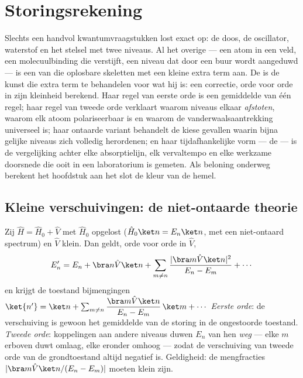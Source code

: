 \chapter{Storingsrekening}\label{ch:b3:perturbation-theory}

Slechts een handvol kwantumvraagstukken lost exact op: de doos, de
oscillator, waterstof en het stelsel met twee niveaus. Al het overige ---
een atom in een veld, een molecuulbinding die verstijft, een niveau dat
door een buur wordt aangeduwd --- is een van die oplosbare skeletten met
een kleine extra term aan. De  is de kunst die extra term
te behandelen voor wat hij is: een correctie, orde voor orde in zijn
kleinheid berekend. Haar regel van eerste orde is een gemiddelde van één
regel; haar regel van tweede orde verklaart waarom niveaus elkaar
\emph{afstoten}, waarom elk atoom polariseerbaar is en waarom de
vanderwaalsaantrekking universeel is; haar ontaarde variant behandelt de
kiese gevallen waarin bijna gelijke niveaus zich volledig herordenen; en
haar tijdafhankelijke vorm --- de  --- is de
vergelijking achter elke absorptielijn, elk vervaltempo en elke werkzame
doorsnede die ooit in een laboratorium is gemeten. Als beloning onderweg
berekent het hoofdstuk aan het slot de kleur van de hemel.

\section{Kleine verschuivingen: de niet-ontaarde theorie}

\begin{theorem}\label{thm:b3:perturbation-theory:corrections}
Zij $\hat H = \hat H_0 + \hat V$ met $\hat H_0$ opgelost ($\hat H_0\ket n = E_n\ket n$, met een niet-ontaard spectrum) en $\hat V$ klein. Dan
geldt, orde voor orde in $\hat V$,
\[
E_n' = E_n + \bra n\hat V\ket n
 + \sum_{m \neq n}\frac{|\bra m\hat V\ket n|^2}{E_n - E_m}
 + \cdots
\]
en krijgt de toestand bijmengingen $\ket{n'} = \ket n + \sum_{m\neq
n}\dfrac{\bra m\hat V\ket n}{E_n - E_m}\,\ket m + \cdots$
\emph{Eerste orde}: de verschuiving is gewoon het gemiddelde van de
storing in de ongestoorde toestand. \emph{Tweede orde}: koppelingen aan
andere niveaus duwen $E_n$ van hen \emph{weg} --- elke $m$ erboven duwt
omlaag, elke eronder omhoog --- zodat de verschuiving van tweede orde van
de grondtoestand altijd negatief is. Geldigheid: de mengfracties
$|\bra m\hat V\ket n/(E_n - E_m)|$ moeten klein zijn.
\end{theorem}

